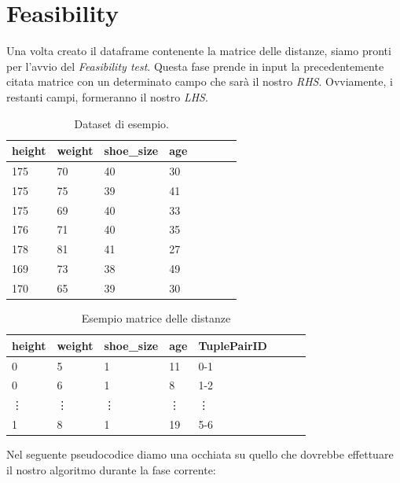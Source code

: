 \newpage
\section{Feasibility}
Una volta creato il dataframe contenente la matrice delle distanze, siamo pronti per l'avvio del \emph{Feasibility test}. Questa fase prende in input la precedentemente citata matrice con un determinato campo che sarà il nostro \emph{RHS}. Ovviamente, i restanti campi, formeranno il nostro \emph{LHS}.
\begin{table}[H]
	\centering
	\begin{tabular}{l l l l l l l l}
		height & weight & shoe{\_}size & age \\
		\hline
		175 & 70 & 40 & 30\\
		175 & 75 & 39 & 41\\
		175 & 69 & 40 & 33\\
		176 & 71 & 40 & 35\\
		178 & 81 & 41 & 27\\
		169 & 73 & 38 & 49\\
		170 & 65 & 39 & 30\\
	\end{tabular}
	\caption{Dataset di esempio.}
	\label{tab:Dataset_di_esempio}
\end{table}
\begin{table}[H]
	\centering
	\begin{tabular}{l l l l l l l l}
		height & weight & shoe{\_}size & age & TuplePairID\\
		\hline
		0 & 5 & 1 & 11 & 0-1\\
		0 & 6 & 1 & 8 & 1-2\\
		\vdots & \vdots &  \vdots &  \vdots &  \vdots \\
		1 & 8 & 1 & 19 & 5-6\\
	\end{tabular}
	\caption{Esempio matrice delle distanze}
	\label{tab:Esempio_DM}
\end{table}
Nel seguente pseudocodice diamo una occhiata su quello che dovrebbe effettuare il nostro algoritmo durante la fase corrente:\\
